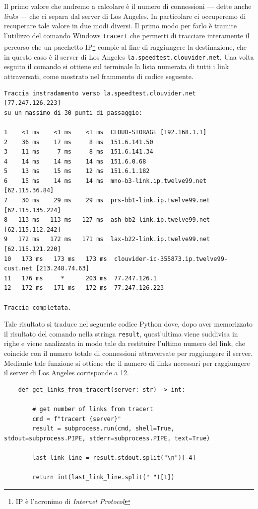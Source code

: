 Il primo valore che andremo a calcolare è il numero di connessioni — dette anche \textsl{links} — che ci separa dal server di Los Angeles. In particolare ci occuperemo di recuperare tale valore in due modi diversi. Il primo modo per farlo è tramite l'utilizzo del comando Windows \texttt{tracert} che permetti di tracciare interamente il percorso che un pacchetto IP\footnote{IP è l'acronimo di \textsl{Internet Protocol}} compie al fine di raggiungere la destinazione, che in questo caso è il server di Los Angeles \texttt{la.speedtest.clouvider.net}. Una volta esguito il comando si ottiene sul terminale la lista numerata di tutti i link attraversati, come mostrato nel frammento di codice seguente. 

\begin{lstlisting}[style = bash]
Traccia instradamento verso la.speedtest.clouvider.net [77.247.126.223]
su un massimo di 30 punti di passaggio:

1    <1 ms    <1 ms    <1 ms  CLOUD-STORAGE [192.168.1.1] 
2    36 ms    17 ms     8 ms  151.6.141.50 
3    11 ms     7 ms     8 ms  151.6.141.34 
4    14 ms    14 ms    14 ms  151.6.0.68 
5    13 ms    15 ms    12 ms  151.6.1.182 
6    15 ms    14 ms    14 ms  mno-b3-link.ip.twelve99.net [62.115.36.84] 
7    30 ms    29 ms    29 ms  prs-bb1-link.ip.twelve99.net [62.115.135.224] 
8   113 ms   113 ms   127 ms  ash-bb2-link.ip.twelve99.net [62.115.112.242] 
9   172 ms   172 ms   171 ms  lax-b22-link.ip.twelve99.net [62.115.121.220] 
10   173 ms   173 ms   173 ms  clouvider-ic-355873.ip.twelve99-cust.net [213.248.74.63] 
11   176 ms     *      203 ms  77.247.126.1 
12   172 ms   171 ms   172 ms  77.247.126.223 

Traccia completata.
\end{lstlisting}

\noindent Tale risultato si traduce nel seguente codice Python dove, dopo aver memorizzato il risultato del comando nella stringa \texttt{result}, quest'ultima viene suddivisa in righe e viene analizzata in modo tale da restituire l'ultimo numero del link, che coincide con il numero totale di connessioni attraversate per raggiungere il server. Mediante tale funzione si ottiene che il numero di links necessari per raggiungere il server di Los Angeles corrisponde a 12.

\begin{lstlisting}
    def get_links_from_tracert(server: str) -> int:

        # get number of links from tracert
        cmd = f"tracert {server}"
        result = subprocess.run(cmd, shell=True, stdout=subprocess.PIPE, stderr=subprocess.PIPE, text=True)

        last_link_line = result.stdout.split("\n")[-4]

        return int(last_link_line.split(" ")[1])
\end{lstlisting}

